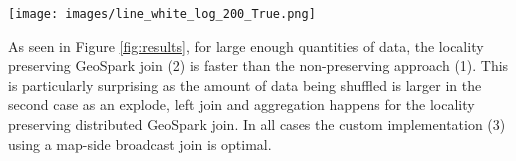 \documentclass[conference]{IEEEtran}
\newcommand{\mycaption}[1]{\stepcounter{figure}%
  {\footnotesize Fig. \thefigure.\hspace{3pt} #1}}
\begin{document}
%

\begin{figure*}
\centering\texttt{[image: images/line\_white\_log\_200\_True.png]}
\centering\caption{load of users (x axis), processing time as average of 5 runs in logarithmic scale (y axis)}
\label{fig:results}
\end{figure*}


As seen in Figure \ref{fig:results}, for large enough quantities of data, the locality preserving GeoSpark join (2) is faster than the non-preserving approach (1). This is particularly surprising as the amount of data being shuffled is larger in the second case as an explode, left join and aggregation happens for the locality preserving distributed GeoSpark join. In all cases the custom implementation (3) using a map-side broadcast join is optimal.
\end{document}

